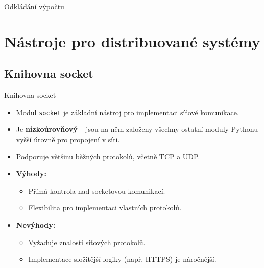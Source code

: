 \documentclass{beamer}
\begin{document}
\begin{frame}{Odkládání výpočtu}

  
  
    \begin{center}

    \end{center}
\end{frame}

\section{Nástroje pro distribuované systémy}
\subsection{Knihovna socket}
\begin{frame}{Knihovna socket}
	\begin{itemize}
		\item Modul \texttt{socket} je základní nástroj pro implementaci síťové komunikace.
		\item Je \textbf{nízkoúrovňový} – jsou na něm založeny všechny ostatní moduly Pythonu vyšší úrovně pro propojení v síti.
		\item Podporuje většinu běžných protokolů, včetně TCP a UDP.
		\item \textbf{Výhody:}
		\begin{itemize}
			\item Přímá kontrola nad socketovou komunikací.
			\item Flexibilita pro implementaci vlastních protokolů.
		\end{itemize}
		\item \textbf{Nevýhody:}
		\begin{itemize}
			\item Vyžaduje znalosti síťových protokolů.
			\item Implementace složitější logiky (např. HTTPS) je náročnější.
		\end{itemize}
	\end{itemize}
\end{frame}
\end{document}

